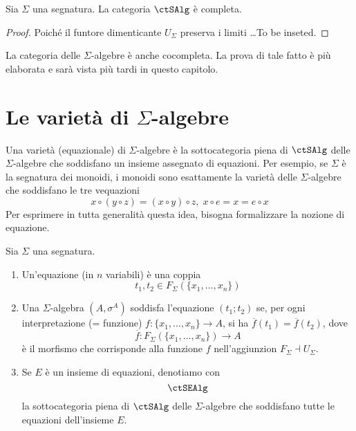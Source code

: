 \begin{proposition}\label{prop_alg_compl}
Sia $\Sigma$ una segnatura. La categoria $\ctSAlg$ è completa.
\end{proposition}

\begin{proof}
Poiché il funtore dimenticante $U_{\Sigma}$ preserva i limiti \ldots To be inseted.
\end{proof} 

La categoria delle $\Sigma$-algebre è anche cocompleta. La prova di tale fatto è più elaborata e sarà vista più tardi in questo capitolo.

\section{Le varietà di $\Sigma$-algebre}\label{sec_var_alg}

Una varietà (equazionale) di $\Sigma$-algebre è la sottocategoria piena di $\ctSAlg$ delle $\Sigma$-algebre che soddisfano un insieme
assegnato di equazioni. Per esempio, se $\Sigma$ è la segnatura dei monoidi, i monoidi sono esattamente la varietà delle $\Sigma$-algebre 
che soddisfano le tre vequazioni 
\[
  x \circ (y \circ z) = (x \circ y) \circ z, \; x \circ e = x = e \circ x 
\]
Per esprimere in tutta generalità questa idea, bisogna formalizzare la nozione di equazione.

\begin{definition}\label{def_equaz_alg}
Sia $\Sigma$ una segnatura.
\begin{enumerate}
\item Un'equazione (in $n$ variabili) è una coppia
\[
  t_1,t_2 \in F_{\Sigma}(\{x_1,\ldots,x_n\}) 
\]
\item Una $\Sigma$-algebra $(A,\sigma^A)$ soddisfa l'equazione $(t_1;t_2)$ se, per ogni interpretazione (= funzione) 
$f \colon \{x_1,\ldots,x_n\} \to A$,
si ha $\overline{f}(t_1) = \overline{f}(t_2)$, dove 
\[
  \overline{f} \colon F_{\Sigma}(\{x_1,\ldots,x_n\}) \to A 
\] 
è il morfismo che corrisponde alla funzione $f$ nell'aggiunzion $F_{\Sigma} \dashv U_{\Sigma}$.
\item Se $E$ è un insieme di equazioni, denotiamo con
\[
  \ctSEAlg 
\]
la sottocategoria piena di $\ctSAlg$ delle $\Sigma$-algebre che soddisfano tutte le equazioni dell'insieme $E$.
\end{enumerate}
\end{definition}

